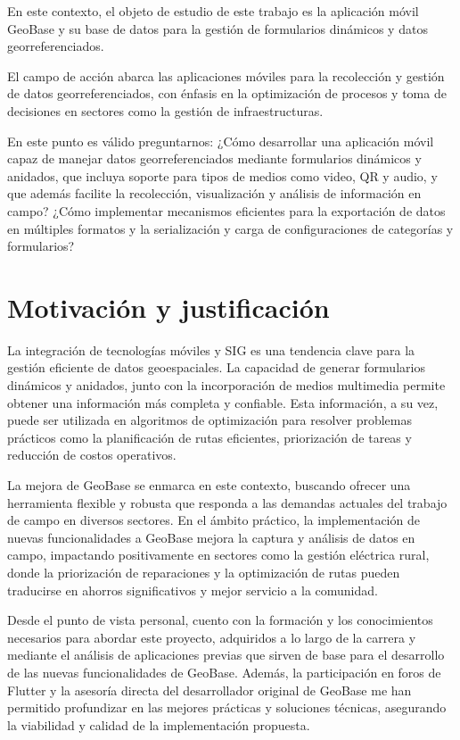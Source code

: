 \documentclass[12pt, a4paper]{book}
\begin{document}
En este contexto, el objeto de estudio de este trabajo es la aplicación móvil GeoBase y su base de datos para la gestión de formularios dinámicos y datos georreferenciados.

El campo de acción abarca las aplicaciones móviles para la recolección y gestión de datos georreferenciados, con énfasis en la optimización de procesos y toma de decisiones en sectores como la gestión de infraestructuras.

En este punto es válido preguntarnos: ¿Cómo desarrollar una aplicación móvil capaz de manejar datos georreferenciados mediante formularios dinámicos y anidados, que incluya soporte para tipos de medios como video, QR y audio, y que además facilite la recolección, visualización y análisis de información en campo? ¿Cómo implementar mecanismos eficientes para la exportación de datos en múltiples formatos y la serialización y carga de configuraciones de categorías y formularios?

\section{Motivación y
justificación}\label{motivaciuxf3n-y-justificaciuxf3n}

La integración de tecnologías móviles y SIG es una tendencia clave para la gestión eficiente de datos geoespaciales. La capacidad de generar formularios dinámicos y anidados, junto con la incorporación de medios multimedia permite obtener una información más completa y confiable. Esta información, a su vez, puede ser utilizada en algoritmos de optimización para resolver problemas prácticos como la planificación de rutas eficientes, priorización de tareas y reducción de costos operativos.

La mejora de GeoBase se enmarca en este contexto, buscando ofrecer una herramienta flexible y robusta que responda a las demandas actuales del trabajo de campo en diversos sectores. En el ámbito práctico, la implementación de nuevas funcionalidades a GeoBase mejora la captura y análisis de datos en campo, impactando positivamente en sectores como la gestión eléctrica rural, donde la priorización de reparaciones y la optimización de rutas pueden traducirse en ahorros significativos y mejor servicio a la comunidad.

Desde el punto de vista personal, cuento con la formación y los conocimientos necesarios para abordar este proyecto, adquiridos a lo largo de la carrera y mediante el análisis de aplicaciones previas que sirven de base para el desarrollo de las nuevas funcionalidades de GeoBase. Además, la participación en foros de Flutter y la asesoría directa del desarrollador original de GeoBase me han permitido profundizar en las mejores prácticas y soluciones técnicas, asegurando la viabilidad y calidad de la implementación propuesta.
\end{document}
